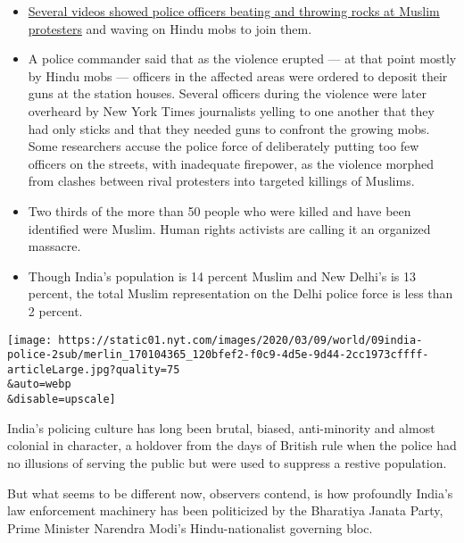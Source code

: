 \begin{itemize}
\tightlist
\item
  \href{https://scroll.in/video/955020/the-police-told-us-to-throw-stones-bbc-meets-delhi-residents-who-took-part-in-communal-violence}{Several
  videos showed police officers beating and throwing rocks at Muslim
  protesters} and waving on Hindu mobs to join them.
\end{itemize}

\begin{itemize}
\tightlist
\item
  A police commander said that as the violence erupted --- at that point
  mostly by Hindu mobs --- officers in the affected areas were ordered
  to deposit their guns at the station houses. Several officers during
  the violence were later overheard by New York Times journalists
  yelling to one another that they had only sticks and that they needed
  guns to confront the growing mobs. Some researchers accuse the police
  force of deliberately putting too few officers on the streets, with
  inadequate firepower, as the violence morphed from clashes between
  rival protesters into targeted killings of Muslims.
\end{itemize}

\begin{itemize}
\item
  Two thirds of the more than 50 people who were killed and have been
  identified were Muslim. Human rights activists are calling it an
  organized massacre.
\item
  Though India's population is 14 percent Muslim and New Delhi's is 13
  percent, the total Muslim representation on the Delhi police force is
  less than 2 percent.
\end{itemize}

\texttt{[image: https://static01.nyt.com/images/2020/03/09/world/09india-police-2sub/merlin\_170104365\_120bfef2-f0c9-4d5e-9d44-2cc1973cffff-articleLarge.jpg?quality=75\\\&auto=webp\\\&disable=upscale]}

India's policing culture has long been brutal, biased, anti-minority and
almost colonial in character, a holdover from the days of British rule
when the police had no illusions of serving the public but were used to
suppress a restive population.

But what seems to be different now, observers contend, is how profoundly
India's law enforcement machinery has been politicized by the Bharatiya
Janata Party, Prime Minister Narendra Modi's Hindu-nationalist governing
bloc.

